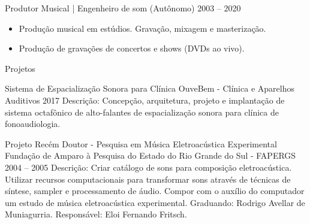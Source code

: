 \documentclass[10pt,a4paper]{altacv}
\begin{document}

\cvevent
{Produtor Musical | Engenheiro de som}
{(Autônomo)}
{2003 -- 2020}{}
\begin{itemize}
\item Produção musical em estúdios. Gravação, mixagem e masterização.
\item Produção de gravações de concertos e shows (DVDs ao vivo).
\end{itemize}


\medskip


\cvsection
{Projetos}

\cvevent
{Sistema de Espacialização Sonora para Clínica}
{OuveBem - Clínica e Aparelhos Auditivos}
{2017}{}
Descrição: Concepção, arquitetura, projeto e implantação de sistema octafônico de alto-falantes de espacialização sonora para clínica de fonoaudiologia.

\divider

\cvevent
{Projeto Recém Doutor - Pesquisa em Música Eletroacústica Experimental}
{Fundação de Amparo à Pesquisa do Estado do Rio Grande do Sul - FAPERGS}
{2004 -- 2005}{}
Descrição: Criar catálogo de sons para composição eletroacústica. Utilizar recursos computacionais para transformar sons através de técnicas de síntese, sampler e processamento de áudio. Compor com o auxílio do computador um estudo de música eletroacústica experimental. Graduando: Rodrigo Avellar de Muniagurria. Responsável: Eloi Fernando Fritsch.

\medskip


\end{document}
